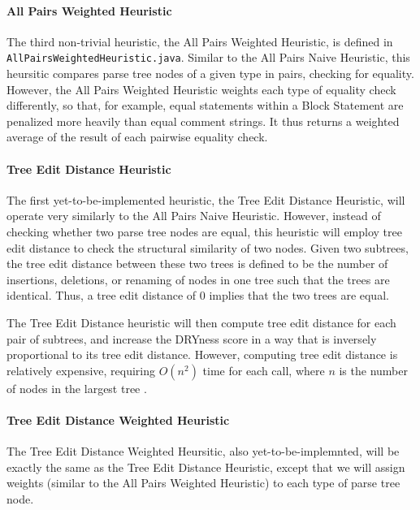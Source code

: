 \documentclass{article}
\begin{document}
\paragraph{All Pairs Weighted Heuristic}

The third non-trivial heuristic, the All Pairs Weighted Heuristic, is defined in \texttt{AllPairsWeightedHeuristic.java}.
Similar to the All Pairs Naive Heuristic, this heursitic compares parse tree nodes of a given type in pairs, checking for equality.
However, the All Pairs Weighted Heuristic weights each type of equality check differently, so that, for example, equal statements
within a Block Statement are penalized more heavily than equal comment strings. It thus returns a weighted average of the result
of each pairwise equality check.

\paragraph{Tree Edit Distance Heuristic}

The first yet-to-be-implemented heuristic, the Tree Edit Distance Heuristic, will operate very similarly to the All Pairs
Naive Heuristic. However, instead of checking whether two parse tree nodes are equal, this heuristic will employ tree edit
distance to check the structural similarity of two nodes. Given two subtrees, the tree edit distance between these two
trees is defined to be the number of insertions, deletions, or renaming of nodes in one tree such that the trees are
identical\cite{TreeEditDistance}. Thus, a tree edit distance of 0 implies that the two trees are equal.

The Tree Edit Distance heuristic will then compute tree edit distance for each pair of subtrees, and increase the DRYness score
in a way that is inversely proportional to its tree edit distance. However, computing tree edit distance is relatively expensive,
requiring $O(n^2)$ time for each call, where $n$ is the number of nodes in the largest tree \cite{TreeEditDistance}.

\paragraph{Tree Edit Distance Weighted Heuristic}

The Tree Edit Distance Weighted Heursitic, also yet-to-be-implemnted, will be exactly the same as the Tree Edit Distance Heuristic,
except that we will assign weights (similar to the All Pairs Weighted Heuristic) to each type of parse tree node.
\end{document}

